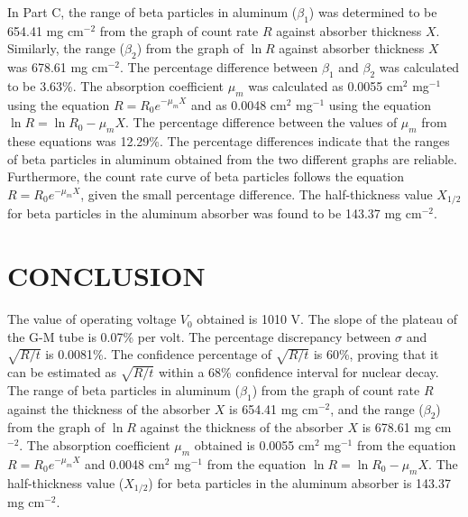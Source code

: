 \documentclass[a4paper,11pt]{article}
\begin{document}
In Part C, the range of beta particles in aluminum (\( \beta_1 \)) was determined to be 654.41 mg cm\(^{-2}\) from the graph of count rate \( R \) against absorber thickness \( X \). Similarly, the range (\( \beta_2 \)) from the graph of \(\ln R\) against absorber thickness \( X \) was 678.61 mg cm\(^{-2}\). The percentage difference between \( \beta_1 \) and \( \beta_2 \) was calculated to be 3.63\%. The absorption coefficient \( \mu_m \) was calculated as 0.0055 cm\(^2\) mg\(^{-1}\) using the equation \( R = R_0 e^{-\mu_m X} \) and as 0.0048 cm\(^2\) mg\(^{-1}\) using the equation \(\ln R = \ln R_0 - \mu_m X\). The percentage difference between the values of \( \mu_m \) from these equations was 12.29\%. The percentage differences indicate that the ranges of beta particles in aluminum obtained from the two different graphs are reliable. Furthermore, the count rate curve of beta particles follows the equation \( R = R_0 e^{-\mu_m X} \), given the small percentage difference. The half-thickness value \( X_{1/2} \) for beta particles in the aluminum absorber was found to be 143.37 mg cm\(^{-2}\).

\newpage
{}
\section*{\center  CONCLUSION}
\label{sec:CONCLUSION}
\qquad The value of operating voltage \( V_0 \) obtained is 1010 V. The slope of the plateau of the G-M tube is 0.07\% per volt. The percentage discrepancy between \( \sigma \) and \( \sqrt{R/t} \) is 0.0081\%. The confidence percentage of \( \sqrt{R/t} \) is 60\%, proving that it can be estimated as \( \sqrt{R/t} \) within a 68\% confidence interval for nuclear decay. The range of beta particles in aluminum (\( \beta_1 \)) from the graph of count rate \( R \) against the thickness of the absorber \( X \) is 654.41 mg cm\(^{-2}\), and the range (\( \beta_2 \)) from the graph of \(\ln R\) against the thickness of the absorber \( X \) is 678.61 mg cm\(^{-2}\). The absorption coefficient \( \mu_m \) obtained is 0.0055 cm\(^2\) mg\(^{-1}\) from the equation \( R = R_0 e^{-\mu_m X} \) and 0.0048 cm\(^2\) mg\(^{-1}\) from the equation \(\ln R = \ln R_0 - \mu_m X\). The half-thickness value (\( X_{1/2} \)) for beta particles in the aluminum absorber is 143.37 mg cm\(^{-2}\).

\newpage
{}
\end{document}
